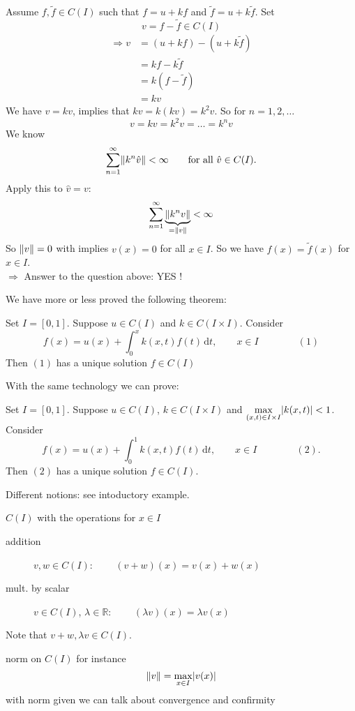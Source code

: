 \begin{enumerate}[1.]
	Assume $f,\tilde f \in C(I)$ such that $f = u + k f$ and $\tilde f = u+ k \tilde f$. Set 
	\[
		v = f- \tilde f \in C(I)
	\]
	\begin{align*}
		\Rightarrow v &= (u+kf) - (u+ k \tilde f) \\ &= kf - k \tilde f \\ &= k(f- \tilde f) \\ &= kv
	\end{align*}
	We have $v = kv$, implies that $kv = k(kv) = k^2v$. So for $n=1,2,\dots$
	\[
		v = kv = k^2v = \dots = k^nv
	\]
	We know 
	\[
		\sum_{n=1}^{\infty}\norm{k^n \hat{v}} < \infty \qquad \text{for all }\hat{v} \in C(I).
	\]
	Apply this to $\hat{v}=v$:
	\[
		\sum_{n=1}^{\infty}\underset{=\norm{v}}{\underbrace{\norm{k^nv}}} < \infty 
	\]
	So $\norm{v}=0$ with implies $v(x)=0$ for all $x \in I$.
	So we have $f(x)=\tilde f(x)$ for $x \in I$. \\
	$\Rightarrow $ Answer to the question above: YES ! 
\end{enumerate}
We have more or less proved the following theorem:
\begin{theorem}
	Set $I=[0,1]$. Suppose $u \in C(I)$ and $k \in C(I \times I)$. Consider 
	\[
		f(x) = u(x)+ \int_{0}^{x} k(x,t) f(t) \,\mathrm{d}t, \qquad x \in I \qquad \qquad (1)
	\]
	Then $(1)$ has a unique solution $f \in C(I)$
\end{theorem}
With the same technology we can prove:
\begin{theorem}
	Set $I = [0,1]$. Suppose $u \in C(I)$, $k \in C(I \times I)$ and $\max\limits_{(x,t) \in I \times I} \lvert k(x,t)\rvert <1$. Consider \[
		f(x) = u(x) + \int_{0}^{1}k(x,t)f(t) \,\mathrm{d}t, \qquad x \in I \qquad \qquad (2).
	\]
	Then $(2)$ has a unique solution $f \in C(I)$.
\end{theorem}
Different notions: see intoductory example.
\begin{definition*}
	$C(I)$ with the operations for $x \in I$
	\begin{description}
		\item[addition] $v,w \in C(I)$: $\qquad (v+w)(x) = v(x)+ w(x)$ 
		\item[mult. by scalar] $v \in C(I)$, $ \lambda \in \mathbb{R}$: $\qquad (\lambda v)(x) = \lambda v(x)$ 
	\end{description}
	Note that $v+w, \lambda v \in C(I)$.
\end{definition*}
\begin{definition*}[norm]
	norm on $C(I)$ for instance 
	\[
		\norm{v} = \max_{x \in I} \abs{v(x)}
	\]
	with norm given we can talk about convergence and confirmity
\end{definition*}
